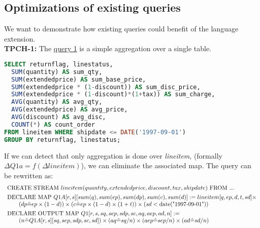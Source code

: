 \documentclass[11pt]{article}
\begin{document}
\subsection{Optimizations of existing queries}
We want to demonstrate how existing queries could benefit of the language extension.\\
\textbf{TPCH-1:} The \href{http://www.tpc.org/tpch/spec/tpch2.16.0.pdf}{query 1} is a simple aggregation over a single table.
\begin{lstlisting}[language=sql]
SELECT returnflag, linestatus, 
  SUM(quantity) AS sum_qty,
  SUM(extendedprice) AS sum_base_price,
  SUM(extendedprice * (1-discount)) AS sum_disc_price,
  SUM(extendedprice * (1-discount)*(1+tax)) AS sum_charge,
  AVG(quantity) AS avg_qty,
  AVG(extendedprice) AS avg_price,
  AVG(discount) AS avg_disc,
  COUNT(*) AS count_order
FROM lineitem WHERE shipdate <= DATE('1997-09-01')
GROUP BY returnflag, linestatus;
\end{lstlisting}
If we can detect that only aggregation is done over {\it lineitem}, (formally $\Delta Q1a=f(\Delta lineitem)$), we can eliminate the associated map. The query can be rewritten as:
\[\begin{array}{l}
\text{CREATE STREAM }lineitem(quantity,extendedprice,discount,tax,shipdate)\text{ FROM }...\vspace{4pt}\\
\text{DECLARE MAP }Q1A[r,s][sum(q),sum(ep),sum(dp),sum(c),sum(d)] := lineitem[q,ep,d,t,sd] \times\\
\qquad (dp \hat= ep\times(1-d)) \times (c \hat= ep\times(1-d)\times(1+t)) \times (sd < \text{date("1997-09-01")})\vspace{4pt}\\
\text{DECLARE OUTPUT MAP }Q1[r,s,sq,sep,sdp,sc,aq,aep,ad,n] := \\
	\qquad (n \hat= Q1A[r,s][sq,sep,sdp,sc,sd]) \times (aq \hat= sq/n) \times (aep \hat= sep/n) \times (ad \hat= sd/n)\vspace{4pt}\\
\end{array}\]
\end{document}
